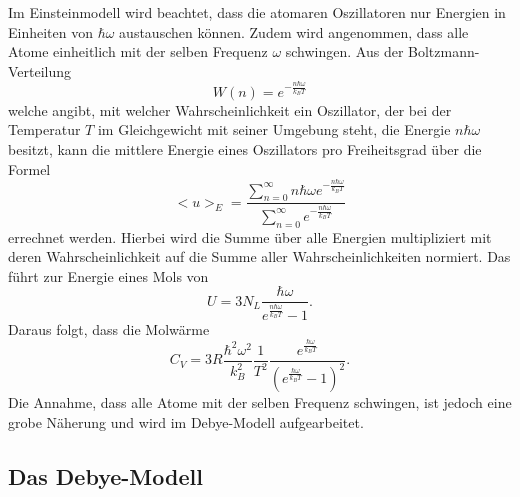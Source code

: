 Im Einsteinmodell wird beachtet, dass die atomaren Oszillatoren nur Energien in Einheiten von $\hbar\omega$ austauschen können.
Zudem wird angenommen, dass alle Atome einheitlich mit der selben Frequenz $\omega$ schwingen.
Aus der Boltzmann-Verteilung
\begin{equation}
  W(n) = e^{-\frac{n\hbar\omega}{k_BT}}
\end{equation}
welche angibt, mit welcher Wahrscheinlichkeit ein Oszillator, der bei der Temperatur $T$ im Gleichgewicht mit seiner Umgebung steht, die Energie $n\hbar\omega$ besitzt, kann die mittlere Energie eines Oszillators pro Freiheitsgrad über die Formel
\begin{equation}
  <u>_E = \frac{\sum_{n=0}^{\infty}n\hbar\omega e^{-\frac{n\hbar\omega}{k_BT}}}{\sum_{n=0}^{\infty} e^{-\frac{n\hbar\omega}{k_BT}}}
\end{equation}
errechnet werden.
Hierbei wird die Summe über alle Energien multipliziert mit deren Wahrscheinlichkeit auf die Summe aller Wahrscheinlichkeiten normiert.
Das führt zur Energie eines Mols von
\begin{equation}
  U = 3N_L\frac{\hbar\omega}{e^{\frac{n\hbar\omega}{k_BT}}-1}.
\end{equation}
Daraus folgt, dass die Molwärme
\begin{equation}
  C_V = 3R\frac{\hbar^2\omega^2}{k_B^2}\frac{1}{T^2}\frac{e^{\frac{\hbar\omega}{k_BT}}}{\left(e^{\frac{\hbar\omega}{k_BT}}-1\right)^2}.
\end{equation}
Die Annahme, dass alle Atome mit der selben Frequenz schwingen, ist jedoch eine grobe Näherung und wird im Debye-Modell aufgearbeitet.

\subsection{Das Debye-Modell}


